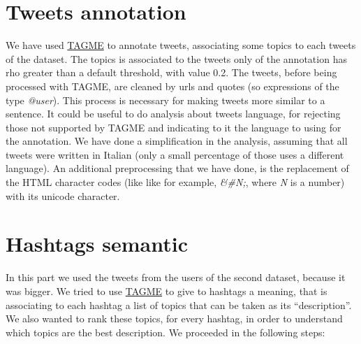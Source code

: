 \documentclass[a4paper,11pt,oneside]{article}
\begin{document}
\section{Tweets annotation}
\label{sec:tagme}
We have used \href{http://tagme.di.unipi.it/}{TAGME} to annotate tweets, associating some topics to each tweets of the dataset. The topics is associated to the tweets only of the annotation has rho greater than a default threshold, with value 0.2.
The tweets, before being processed with TAGME, are cleaned by urls and quotes (so expressions of the type \textit{@user}). This process is necessary for making tweets more similar to a sentence.
It could be useful to do analysis about tweets language, for rejecting those not supported by TAGME and indicating to it the language to using for the annotation.
We have done a simplification in the analysis, assuming that all tweets were written in Italian (only a small percentage of those uses a different language).
An additional preprocessing that we have done, is the replacement of the HTML character codes (like like for example, \textsl{\&\#N;}, where \textit{N} is a number) with its unicode character.


\section{Hashtags semantic}
\label{sec:hashtags}
In this part we used the tweets from the users of the second dataset, because it was bigger. We tried to use \href{http://tagme.di.unipi.it/}{TAGME} to give to hashtags a meaning, that is associating to each hashtag a list of topics that can be taken as its ``description''. We also wanted to rank these topics, for every hashtag, in order to understand which topics are the best description.
We proceeded in the following steps:
\end{document}
